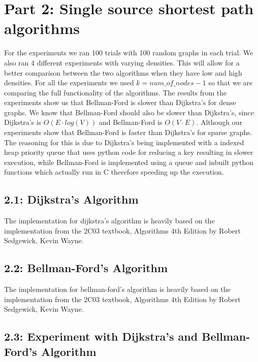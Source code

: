 \documentclass[12pt]{article}
\begin{document}
\newpage
\section*{Part 2: Single source shortest path algorithms}

For the experiments we ran 100 trials with 100 random graphs in each trial. We also ran 4 different experiments with varying densities. This will allow for a better comparison between the two algorithms when they have low and high densities. For all the experiments we used $k=num\_of\_nodes-1$ so that we are comparing the full functionality of the algorithms. \newline
\newline
The results from the experiments show us that Bellman-Ford is slower than Dijkstra's for dense graphs. We know that Bellman-Ford should also be slower than Dijkstra's, since Dijkstra's is $O(E \cdot log(V))$ and Bellman-Ford is $O(V\cdot E)$. Although our experiments show that Bellman-Ford is faster than Dijkstra's for sparse graphs. The reasoning for this is due to Dijkstra's being implemented with a indexed heap priority queue that uses python code for reducing a key resulting in slower execution, while Bellman-Ford is implemented using a queue and inbuilt python functions which actually run in C therefore speeding up the execution.

\subsection*{2.1: Dijkstra's Algorithm}
The implementation for dijkstra's algorithm is heavily based on the implementation from the 2C03 textbook, Algorithms 4th Edition by Robert Sedgewick, Kevin Wayne.

\subsection*{2.2: Bellman-Ford's Algorithm}
The implementation for bellman-ford's algorithm is heavily based on the implementation from the 2C03 textbook, Algorithms 4th Edition by Robert Sedgewick, Kevin Wayne.

\subsection*{2.3: Experiment with Dijkstra's and Bellman-Ford's Algorithm}
\end{document}
